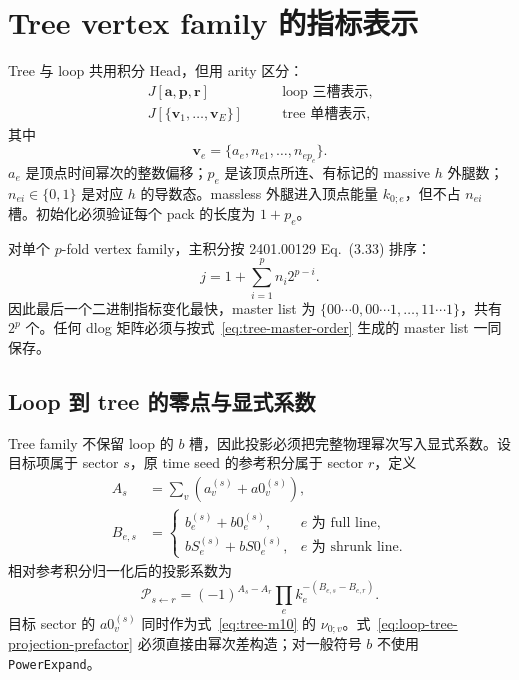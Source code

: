 ﻿\documentclass[a4paper,11pt]{article}
\begin{document}
\section{Tree vertex family 的指标表示}

Tree 与 loop 共用积分 Head，但用 arity 区分：
\begin{align}
 J[\bm a,\bm p,\bm r]&\qquad\text{loop 三槽表示},\\
 J[\{\bm v_1,\ldots,\bm v_E\}]&\qquad\text{tree 单槽表示},
\end{align}
其中
\begin{equation}
 \bm v_e=\{a_e,n_{e1},\ldots,n_{e p_e}\}.
 \label{eq:tree-vertex-pack}
\end{equation}
$a_e$ 是顶点时间幂次的整数偏移；$p_e$ 是该顶点所连、有标记的 massive $h$ 外腿数；$n_{ei}\in\{0,1\}$ 是对应 $h$ 的导数态。massless 外腿进入顶点能量 $k_{0;e}$，但不占 $n_{ei}$ 槽。初始化必须验证每个 pack 的长度为 $1+p_e$。

对单个 $p$-fold vertex family，主积分按 2401.00129 Eq.~(3.33) 排序：
\begin{equation}
 j=1+\sum_{i=1}^{p}n_i2^{p-i}.
 \label{eq:tree-master-order}
\end{equation}
因此最后一个二进制指标变化最快，master list 为 $\{00\cdots0,00\cdots1,\ldots,11\cdots1\}$，共有 $2^p$ 个。任何 dlog 矩阵必须与按式~\eqref{eq:tree-master-order} 生成的 master list 一同保存。

\subsection{Loop 到 tree 的零点与显式系数}

Tree family 不保留 loop 的 $b$ 槽，因此投影必须把完整物理幂次写入显式系数。设目标项属于 sector $s$，原 time seed 的参考积分属于 sector $r$，定义
\begin{align}
 A_s&=\sum_v\left(a_v^{(s)}+a0_v^{(s)}\right),\\
 B_{e,s}&=\begin{cases}
 b_e^{(s)}+b0_e^{(s)},&e\text{ 为 full line},\\
 bS_e^{(s)}+bS0_e^{(s)},&e\text{ 为 shrunk line}.
 \end{cases}
\end{align}
相对参考积分归一化后的投影系数为
\begin{equation}
 \mathcal P_{s\leftarrow r}
 =(-1)^{A_s-A_r}\prod_e k_e^{-\left(B_{e,s}-B_{e,r}\right)}.
 \label{eq:loop-tree-projection-prefactor}
\end{equation}
目标 sector 的 $a0_v^{(s)}$ 同时作为式~\eqref{eq:tree-m10} 的 $\nu_{0;v}$。式~\eqref{eq:loop-tree-projection-prefactor} 必须直接由幂次差构造；对一般符号 $b$ 不使用 \texttt{PowerExpand}。
\end{document}
